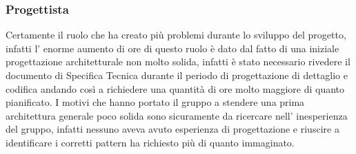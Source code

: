 \subsubsection{Progettista}
Certamente il ruolo che ha creato più problemi durante lo sviluppo del progetto, infatti l' enorme aumento di ore di questo ruolo è dato dal fatto di una iniziale progettazione architetturale non molto solida, infatti è stato necessario rivedere il documento di Specifica Tecnica durante il periodo di progettazione di dettaglio e codifica andando così a richiedere una quantità di ore molto maggiore di quanto pianificato. I motivi che hanno portato il gruppo a stendere una prima architettura generale poco solida sono sicuramente da ricercare nell' inesperienza del gruppo, infatti nessuno aveva avuto esperienza di progettazione e riuscire a identificare i corretti pattern ha richiesto più di quanto immaginato.
